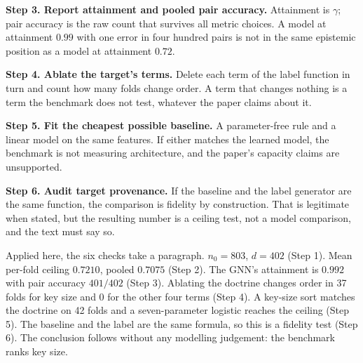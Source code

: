 \documentclass[journal,10pt]{IEEEtran}
\newcommand{\distinct}{d}
\newcommand{\nzero}{n_0}
\begin{document}
\textbf{Step 3. Report attainment and pooled pair accuracy.} Attainment is $\gamma$; pair accuracy
is the raw count that survives all metric choices. A model at attainment $0.99$ with one error in
four hundred pairs is not in the same epistemic position as a model at attainment $0.72$.

\textbf{Step 4. Ablate the target's terms.} Delete each term of the label function in turn and
count how many folds change order. A term that changes nothing is a term the benchmark does not
test, whatever the paper claims about it.

\textbf{Step 5. Fit the cheapest possible baseline.} A parameter-free rule and a linear model on
the same features. If either matches the learned model, the benchmark is not measuring
architecture, and the paper's capacity claims are unsupported.

\textbf{Step 6. Audit target provenance.} If the baseline and the label generator are the same
function, the comparison is fidelity by construction. That is legitimate when stated, but the
resulting number is a ceiling test, not a model comparison, and the text must say so.

Applied here, the six checks take a paragraph. $\nzero=803$, $\distinct=402$ (Step 1). Mean
per-fold ceiling $0.7210$, pooled $0.7075$ (Step 2). The GNN's attainment is $0.992$ with pair
accuracy $401/402$ (Step 3). Ablating the doctrine changes order in 37 folds for key size and 0 for
the other four terms (Step 4). A key-size sort matches the doctrine on 42 folds and a
seven-parameter logistic reaches the ceiling (Step 5). The baseline and the label are the same
formula, so this is a fidelity test (Step 6). The conclusion follows without any modelling
judgement: the benchmark ranks key size.
\end{document}
